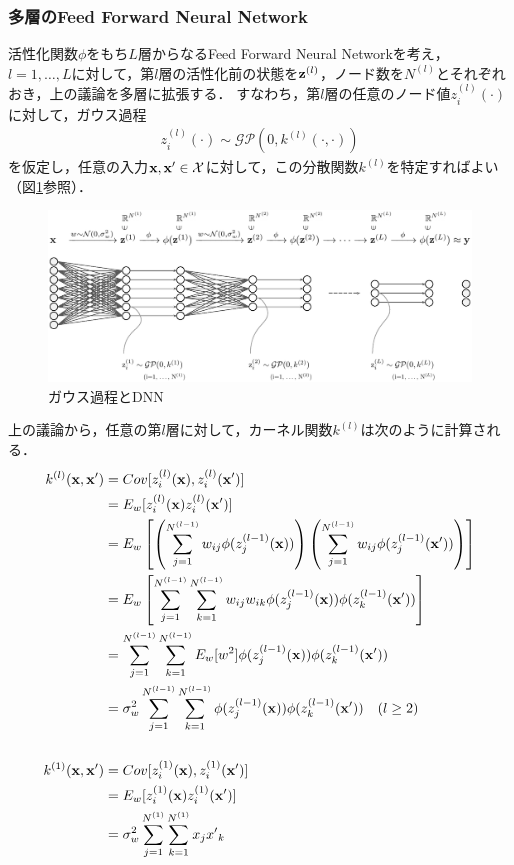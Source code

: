 \documentclass[11pt,a4j]{article}
\begin{document}
      \subsubsection{多層のFeed Forward Neural Network}
        活性化関数$\phi$をもち$L$層からなるFeed Forward Neural Networkを考え，$l=1, \dots, L$に対して，第$l$層の活性化前の状態を${\bf z}^{(l)}$，ノード数を$N^{(l)}$とそれぞれおき，上の議論を多層に拡張する．
        すなわち，第$l$層の任意のノード値$z_i^{(l)}(\cdot)$に対して，ガウス過程
        \begin{align}
          z_i^{(l)}(\cdot) \sim \mathcal{GP}(0, k^{(l)}(\cdot,\cdot))
        \end{align}
        を仮定し，任意の入力${\bf x}, {\bf x}' \in \mathcal{X}$に対して，この分散関数$k^{(l)}$を特定すればよい（図\ref{fig:dnn_gp}参照）．
        \begin{figure}[htbp]
          \begin{center}
            \includegraphics[width=12.0cm]{./figures/dnn_gp.eps}
            \caption{ガウス過程とDNN}
            \label{fig:dnn_gp}
          \end{center}
        \end{figure}
        上の議論から，任意の第$l$層に対して，カーネル関数$k^{(l)}$は次のように計算される．
        \begin{align}
          k^{(l)}({\bf x},{\bf x}') 
          &= Cov[ z_i^{(l)}({\bf x}), z_i^{(l)}({\bf x}')] \\
          &= E_w [z_i^{(l)}({\bf x}) z_i^{(l)}({\bf x}') ] \\
          &= E_w \left[ \left( \sum_{j=1}^{N^{(l-1)}} w_{ij} \phi(z_j^{(l-1)}({\bf x})) \right) \left( \sum_{j=1}^{N^{(l-1)}} w_{ij} \phi(z_j^{(l-1)}({\bf x}')) \right) \right] \\
          &= E_w \left[ \sum_{j=1}^{N^{(l-1)}} \sum_{k=1}^{N^{(l-1)}} w_{ij} w_{ik} \phi(z_j^{(l-1)}({\bf x})) \phi(z_k^{(l-1)}({\bf x}')) \right] \\
          &= \sum_{j=1}^{N^{(l-1)}} \sum_{k=1}^{N^{(l-1)}} E_w [w^2] \phi(z_j^{(l-1)}({\bf x})) \phi(z_k^{(l-1)}({\bf x}')) \\
          &= \sigma_w^2 \sum_{j=1}^{N^{(l-1)}} \sum_{k=1}^{N^{(l-1)}} \phi(z_j^{(l-1)}({\bf x})) \phi(z_k^{(l-1)}({\bf x}')) ~~~ ( l \geq 2 ) \\
          \\
          k^{(1)}({\bf x},{\bf x}') 
          &= Cov[ z_i^{(1)}({\bf x}), z_i^{(1)}({\bf x}')] \\
          &= E_w[z_i^{(1)}({\bf x}) z_i^{(1)}({\bf x}') ] \\
          &= \sigma_w^2 \sum_{j=1}^{N^{(1)}} \sum_{k=1}^{N^{(1)}} x_j {x'}_k 
        \end{align}
\end{document}
